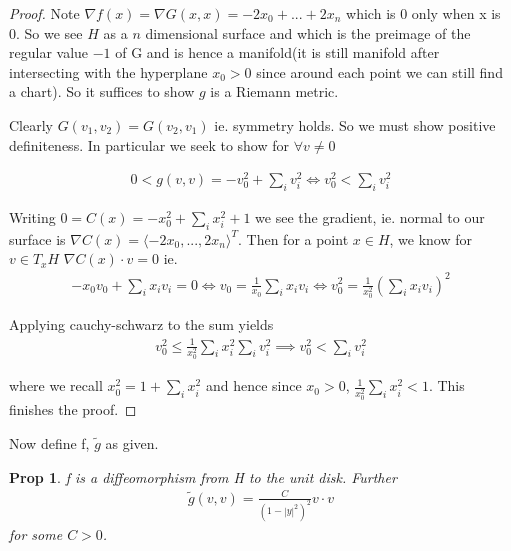 \documentclass[11pt]{article}
\newtheorem{prop}{Prop}
\begin{document}
\begin{proof}
	Note $\nabla f(x) = \nabla G(x,x) = -2x_0 + ... + 2x_n$ which is 0 only when x is 0. So we see $H$ as a $n$ dimensional surface and which is the preimage of the regular value $-1$ of G and is hence a manifold(it is still manifold after intersecting with the hyperplane $x_0 > 0$ since around each point we can still find a chart). So it suffices to show $g$ is a Riemann metric.

	Clearly $G(v_1,v_2) = G(v_2,v_1)$ ie. symmetry holds. So we must show positive definiteness. In particular we seek to show for $\forall v \neq 0$

	\begin{align*}
		0 < g(v,v) = -v_0^2 + \sum_i v_i^2 \iff v_0^2 < \sum_i v_i^2
	\end{align*}

	 Writing $0 = C(x) = -x_0^2+\sum_i x_i^2 +1$ we see the gradient, ie. normal to our surface is $\nabla C(x) = \langle -2x_0,...,2x_n\rangle^T$. Then for a point $x \in H$, we know for $v\in T_xH$ $\nabla C(x) \cdot v = 0$ ie. 
	\begin{align*}
		-x_0v_0 + \sum_i x_iv_i = 0 \iff v_0 = \frac{1}{x_0} \sum_i x_iv_i \iff v_0^2 = \frac{1}{x_0^2}(\sum_i x_iv_i)^2
	\end{align*}

	Applying cauchy-schwarz to the sum yields
	\begin{align*}
		v_0^2 \leq \frac{1}{x_0^2} \sum_i x_i^2 \sum_i v_i^2 \implies v_0^2 <
		 \sum_i v_i^2 
	\end{align*}

	where we recall $x_0^2 = 1+ \sum_i x_i^2$ and hence since $x_0>0$, $\frac{1}{x_0^2} \sum_i x_i^2 < 1$. This finishes the proof.

\end{proof}

Now define f, $\tilde{g}$ as given. 

\begin{prop}
	f is a diffeomorphism from H to the unit disk. Further 
	\begin{align*}
		\tilde{g}(v,v) = \frac{C}{(1-|y|^2)^2}v \cdot v
	\end{align*}
	for some $C > 0$. %
\end{prop}
\end{document}
